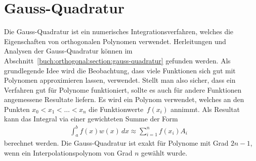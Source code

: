 %
%
%
\section{Gauss-Quadratur%
  \label{laguerre:section:quadratur}}
%
Die Gauss-Quadratur ist ein numerisches Integrationsverfahren,
welches die Eigenschaften von orthogonalen Polynomen verwendet.
Herleitungen und Analysen der Gauss-Quadratur können im
Abschnitt~\ref{buch:orthogonal:section:gauss-quadratur} gefunden werden.
Als grundlegende Idee wird die Beobachtung,
dass viele Funktionen sich gut mit Polynomen approximieren lassen,
verwendet.
Stellt man also sicher,
dass ein Verfahren gut für Polynome funktioniert,
sollte es auch für andere Funktionen angemessene Resultate liefern.
Es wird ein Polynom verwendet,
welches an den Punkten $x_0 < x_1 < \ldots < x_n$
die Funktionwerte~$f(x_i)$ annimmt.
Als Resultat kann das Integral via einer gewichteten Summe der Form
\begin{align}
\int_a^b f(x) w(x) \, dx
\approx
\sum_{i=1}^n f(x_i) A_i
\label{laguerre:gaussquadratur}
\end{align}
berechnet werden.
Die Gauss-Quadratur ist exakt für Polynome mit Grad $2n -1$,
wenn ein Interpolationspolynom von Grad $n$ gewählt wurde.

